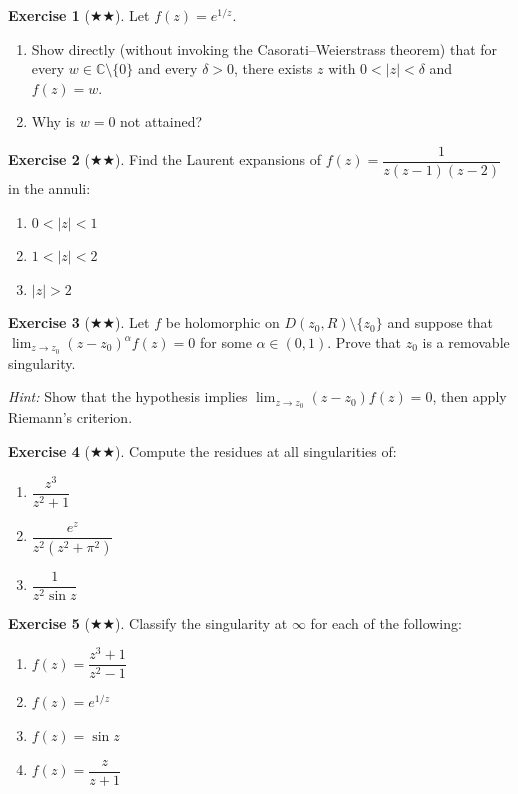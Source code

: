 \documentclass[12pt,a4paper,openany]{book}
\theoremstyle{definition}
\newtheorem{exercise}{Exercise}[chapter]
\theoremstyle{plain}
\theoremstyle{remark}
\newcommand{\C}{\mathbb{C}}
\newcommand{\abs}[1]{\left|#1\right|}
\begin{document}
\begin{exercise}[$\bigstar\!\bigstar$]\label{exo:casorati-example}
Let $f(z)=e^{1/z}$.
\begin{enumerate}[label=(\alph*)]
  \item Show directly (without invoking the Casorati--Weierstrass theorem) that
    for every $w\in\C\setminus\{0\}$ and every $\delta>0$, there exists $z$ with
    $0<\abs{z}<\delta$ and $f(z)=w$.
  \item Why is $w=0$ not attained?
\end{enumerate}
\end{exercise}

\begin{exercise}[$\bigstar\!\bigstar$]\label{exo:laurent-multiple-centers}
Find the Laurent expansions of $f(z)=\dfrac{1}{z(z-1)(z-2)}$ in the annuli:
\begin{enumerate}[label=(\alph*)]
  \item $0<\abs{z}<1$
  \item $1<\abs{z}<2$
  \item $\abs{z}>2$
\end{enumerate}
\end{exercise}

\begin{exercise}[$\bigstar\!\bigstar$]\label{exo:removable-criterion}
Let $f$ be holomorphic on $D(z_0,R)\setminus\{z_0\}$ and suppose that
$\lim_{z\to z_0}(z-z_0)^{\alpha}f(z)=0$ for some $\alpha\in(0,1)$. Prove that
$z_0$ is a removable singularity.

\textit{Hint:} Show that the hypothesis implies $\lim_{z\to z_0}(z-z_0)f(z)=0$,
then apply Riemann's criterion.
\end{exercise}

\begin{exercise}[$\bigstar\!\bigstar$]\label{exo:residue-computations}
Compute the residues at all singularities of:
\begin{enumerate}[label=(\alph*)]
  \item $\dfrac{z^3}{z^2+1}$
  \item $\dfrac{e^z}{z^2(z^2+\pi^2)}$
  \item $\dfrac{1}{z^2\sin z}$
\end{enumerate}
\end{exercise}

\begin{exercise}[$\bigstar\!\bigstar$]\label{exo:singularity-infinity-classify}
Classify the singularity at $\infty$ for each of the following:
\begin{enumerate}[label=(\alph*)]
  \item $f(z)=\dfrac{z^3+1}{z^2-1}$
  \item $f(z)=e^{1/z}$
  \item $f(z)=\sin z$
  \item $f(z)=\dfrac{z}{z+1}$
\end{enumerate}
\end{exercise}
\end{document}
